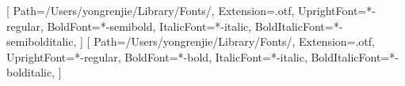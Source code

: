 \usepackage{fontspec}
\usepackage{amsmath}
\usepackage{mathtools}
\usepackage[warnings-off={mathtools-colon,mathtools-overbracket}]{unicode-math}

\setmainfont[
  Path={/Users/yongrenjie/Library/Fonts/},
  Extension=.otf,
  UprightFont={*-regular},
  BoldFont={*-semibold},
  ItalicFont={*-italic},
  BoldItalicFont={*-semibolditalic},
]{minion3}
\setmonofont[
  Path={/Users/yongrenjie/Library/Fonts/},
  Extension=.otf,
  UprightFont={*-Regular},
  BoldFont={*-Bold},
  Scale=MatchLowercase
]{Inconsolata}

[
  Path={/Users/yongrenjie/Library/Fonts/},
  Extension=.otf,
  UprightFont={*-regular},
  BoldFont={*-semibold},
  ItalicFont={*-italic},
  BoldItalicFont={*-semibolditalic},
]
[
  Path={/Users/yongrenjie/Library/Fonts/},
  Extension=.otf,
  UprightFont={*-regular},
  BoldFont={*-bold},
  ItalicFont={*-italic},
  BoldItalicFont={*-bolditalic},
]


\usepackage{microtype}
